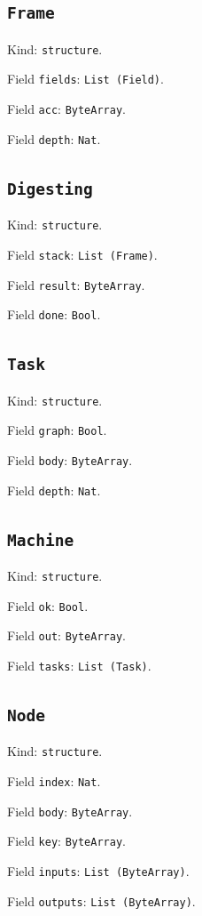 \documentclass[11pt]{article}
\begin{document}
\subsection*{\texttt{Frame}}
\noindent Kind: \texttt{structure}.\par
\noindent Field \texttt{fields}: \texttt{List (Field)}.\par
\noindent Field \texttt{acc}: \texttt{ByteArray}.\par
\noindent Field \texttt{depth}: \texttt{Nat}.\par
\subsection*{\texttt{Digesting}}
\noindent Kind: \texttt{structure}.\par
\noindent Field \texttt{stack}: \texttt{List (Frame)}.\par
\noindent Field \texttt{result}: \texttt{ByteArray}.\par
\noindent Field \texttt{done}: \texttt{Bool}.\par
\subsection*{\texttt{Task}}
\noindent Kind: \texttt{structure}.\par
\noindent Field \texttt{graph}: \texttt{Bool}.\par
\noindent Field \texttt{body}: \texttt{ByteArray}.\par
\noindent Field \texttt{depth}: \texttt{Nat}.\par
\subsection*{\texttt{Machine}}
\noindent Kind: \texttt{structure}.\par
\noindent Field \texttt{ok}: \texttt{Bool}.\par
\noindent Field \texttt{out}: \texttt{ByteArray}.\par
\noindent Field \texttt{tasks}: \texttt{List (Task)}.\par
\subsection*{\texttt{Node}}
\noindent Kind: \texttt{structure}.\par
\noindent Field \texttt{index}: \texttt{Nat}.\par
\noindent Field \texttt{body}: \texttt{ByteArray}.\par
\noindent Field \texttt{key}: \texttt{ByteArray}.\par
\noindent Field \texttt{inputs}: \texttt{List (ByteArray)}.\par
\noindent Field \texttt{outputs}: \texttt{List (ByteArray)}.\par
\end{document}
